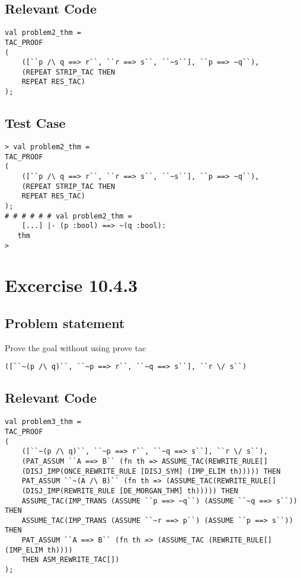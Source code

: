 \documentclass{report}
\begin{document}
\section{Relevant Code}
\label{rel-code-10-4-2}
\begin{lstlisting}[frame=TBlr]
val problem2_thm =
TAC_PROOF
(
	([``p /\ q ==> r``, ``r ==> s``, ``~s``], ``p ==> ~q``),
	(REPEAT STRIP_TAC THEN
	REPEAT RES_TAC)
);
\end{lstlisting}

\section{Test Case}
\label{trans-10-4-2}
\begin{session}
  \begin{scriptsize}
\begin{verbatim}
> val problem2_thm =
TAC_PROOF
(
	([``p /\ q ==> r``, ``r ==> s``, ``~s``], ``p ==> ~q``),
	(REPEAT STRIP_TAC THEN
	REPEAT RES_TAC)
);
# # # # # # val problem2_thm =
    [...] |- (p :bool) ==> ~(q :bool):
   thm
> 
\end{verbatim}
  \end{scriptsize}
\end{session}

\chapter{Excercise 10.4.3}
\label{cha:10-4-3}

\section{Problem statement}
\label{problem-statement-10-4-3}
Prove the goal without using prove tac
\begin{lstlisting}[frame=tblr]
([``~(p /\ q)``, ``~p ==> r``, ``~q ==> s``], ``r \/ s``)
\end{lstlisting}

\section{Relevant Code}
\label{rel-code-10-4-3}
\begin{lstlisting}[frame=TBlr]
val problem3_thm =
TAC_PROOF
(
	([``~(p /\ q)``, ``~p ==> r``, ``~q ==> s``], ``r \/ s``),
	(PAT_ASSUM ``A ==> B`` (fn th => ASSUME_TAC(REWRITE_RULE[]
	(DISJ_IMP(ONCE_REWRITE_RULE [DISJ_SYM] (IMP_ELIM th))))) THEN
	PAT_ASSUM ``~(A /\ B)`` (fn th => (ASSUME_TAC(REWRITE_RULE[]
	(DISJ_IMP(REWRITE_RULE [DE_MORGAN_THM] th))))) THEN
	ASSUME_TAC(IMP_TRANS (ASSUME ``p ==> ~q``) (ASSUME ``~q ==> s``)) THEN
	ASSUME_TAC(IMP_TRANS (ASSUME ``~r ==> p``) (ASSUME ``p ==> s``)) THEN
	PAT_ASSUM ``A ==> B`` (fn th => (ASSUME_TAC (REWRITE_RULE[] (IMP_ELIM th))))
	THEN ASM_REWRITE_TAC[])
);
\end{lstlisting}
\end{document}
